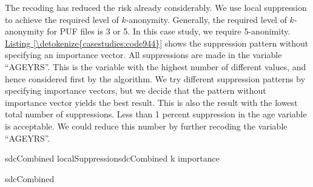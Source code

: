 \documentclass[letterpaper,10pt,english]{sphinxmanual}
\begin{document}

The recoding has reduced the risk already considerably. We use local
suppression to achieve the required level of \(k\)-anonymity.
Generally, the required level of \(k\)-anonymity for PUF files is 3
or 5. In this case study, we require 5-anonimity. \hyperref[\detokenize{casestudies:code944}]{Listing \ref{\detokenize{casestudies:code944}}} shows the
suppression pattern without specifying an importance vector. All
suppressions are made in the variable “AGEYRS”. This is the variable
with the highest number of different values, and hence considered first
by the algorithm. We try different suppression patterns by specifying
importance vectors, but we decide that the pattern without importance
vector yields the best result. This is also the result with the lowest
total number of suppressions. Less than 1 percent suppression in the age
variable is acceptable. We could reduce this number by further recoding
the variable “AGEYRS”.

\def\sphinxLiteralBlockLabel{\label{\detokenize{casestudies:code944}}}
%
\begin{sphinxVerbatim}[commandchars=\\\{\},numbers=left,firstnumber=1,stepnumber=1]
sdcCombined  localSuppressionsdcCombined k   importance  

sdcCombined 
\end{sphinxVerbatim}
\end{document}
